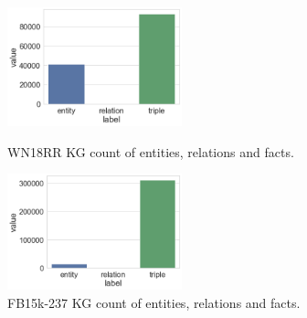 \begin{figure}[H]
	\parbox{.5\linewidth}{
   		\centering
    		\includegraphics[width=0.45\textwidth]{WN18RR_Counts}
		\captionsetup{justification=centering}
		\caption{WN18RR KG count of entities, relations and facts.}
		}
	\hfill
	\parbox{.5\linewidth}{
   		\centering
    		\includegraphics[width=0.45\textwidth]{FB15k-237_Counts}
		\captionsetup{justification=centering}
		\caption{FB15k-237 KG count of entities, relations and facts.}
		}
\end{figure}


